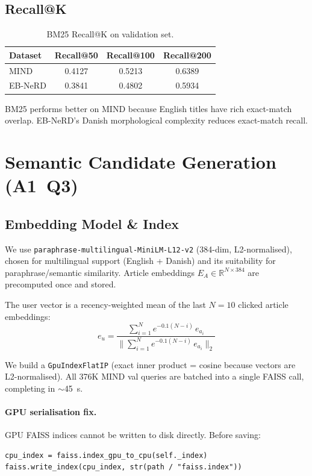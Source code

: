 \documentclass[11pt,a4paper]{article}
\begin{document}
\subsection{Recall@K}

\begin{table}[h]
\centering
\caption{BM25 Recall@K on validation set.}
\label{tab:bm25}
\begin{tabular}{lccc}
\toprule
Dataset & Recall@50 & Recall@100 & Recall@200 \\
\midrule
MIND    & 0.4127 & 0.5213 & 0.6389 \\
EB-NeRD & 0.3841 & 0.4802 & 0.5934 \\
\bottomrule
\end{tabular}
\end{table}

BM25 performs better on MIND because English titles have rich exact-match
overlap. EB-NeRD's Danish morphological complexity reduces exact-match recall.

\section{Semantic Candidate Generation (A1~Q3)}

\subsection{Embedding Model \& Index}

We use \texttt{paraphrase-multilingual-MiniLM-L12-v2} (384-dim, L2-normalised),
chosen for multilingual support (English + Danish) and its suitability for
paraphrase/semantic similarity. Article embeddings $E_A \in \mathbb{R}^{N
\times 384}$ are precomputed once and stored.

The user vector is a recency-weighted mean of the last $N{=}10$ clicked article
embeddings:
\begin{equation}
e_u = \frac{\sum_{i=1}^{N} e^{-0.1(N-i)}\, e_{a_i}}
           {\bigl\|\sum_{i=1}^{N} e^{-0.1(N-i)}\, e_{a_i}\bigr\|_2}
\end{equation}

We build a \texttt{GpuIndexFlatIP} (exact inner product = cosine because vectors
are L2-normalised). All 376K MIND val queries are batched into a single FAISS
call, completing in $\sim$45~s.

\paragraph{GPU serialisation fix.} GPU FAISS indices cannot be written to disk
directly. Before saving:
\begin{lstlisting}
cpu_index = faiss.index_gpu_to_cpu(self._index)
faiss.write_index(cpu_index, str(path / "faiss.index"))
\end{lstlisting}
\end{document}
